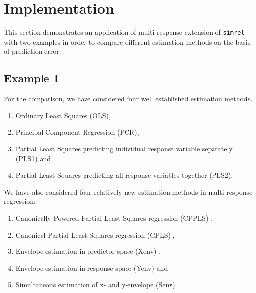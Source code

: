 \documentclass[review]{elsarticle}
\providecommand{\tightlist}{%
  \setlength{\itemsep}{0pt}\setlength{\parskip}{0pt}}
\theoremstyle{definition}
\theoremstyle{definition}
\theoremstyle{definition}
\theoremstyle{remark}
\begin{document}
\hypertarget{implementation}{\section{Implementation}\label{implementation}}

This section demonstrates an application of multi-response extension of
\texttt{simrel} with two examples in order to compare different
estimation methods on the basis of prediction error.

\subsection{Example 1}\label{example-1}

For the comparison, we have considered four well established estimation
methods.

\begin{enumerate}
\def\labelenumi{\alph{enumi})}
\tightlist
\item
  Ordinary Least Squares (OLS),
\item
  Principal Component Regression (PCR),
\item
  Partial Least Squares predicting individual response variable
  separately (PLS1) and
\item
  Partial Least Squares predicting all response variables together
  (PLS2).
\end{enumerate}

We have also considered four relatively new estimation methods in
multi-response regression:

\begin{enumerate}
\def\labelenumi{\alph{enumi})}
\tightlist
\item
  Canonically Powered Partial Least Squares regression (CPPLS)
  \citep{indahl2009canonical},
\item
  Canonical Partial Least Squares regression (CPLS)
  \citep{indahl2009canonical},
\item
  Envelope estimation in predictor space (Xenv)
  \citep{cook2010envelope},
\item
  Envelope estimation in response space (Yenv)
  \citep{cook2015foundations} and
\item
  Simultaneous estimation of x- and y-envelope (Senv)
  \citep{cook2015simultaneous}
\end{enumerate}
\end{document}
